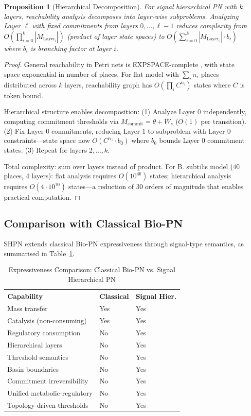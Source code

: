 \documentclass[10pt,letterpaper]{article}
\newtheorem{proposition}{Proposition}
\begin{document}
\begin{proposition}[Hierarchical Decomposition]
For signal hierarchical PN with $k$ layers, reachability analysis decomposes into layer-wise subproblems. Analyzing Layer $\ell$ with fixed commitments from layers $0, \ldots, \ell-1$ reduces complexity from $O(\prod_{i=0}^{k} |M_{\text{Layer}_i}|)$ (product of layer state spaces) to $O(\sum_{i=0}^{k} |M_{\text{Layer}_i}| \cdot b_i)$ where $b_i$ is branching factor at layer $i$.
\end{proposition}

\begin{proof}
General reachability in Petri nets is EXPSPACE-complete \cite{esparza1996}, with state space exponential in number of places. For flat model with $\sum_i n_i$ places distributed across $k$ layers, reachability graph has $O(\prod_i C^{n_i})$ states where $C$ is token bound.

Hierarchical structure enables decomposition: (1) Analyze Layer 0 independently, computing commitment thresholds via $M_{\text{commit}} = \theta + W_s$ ($O(1)$ per transition). (2) Fix Layer 0 commitments, reducing Layer 1 to subproblem with Layer 0 constraints---state space now $O(C^{n_1} \cdot b_0)$ where $b_0$ bounds Layer 0 commitment states. (3) Repeat for layers $2, \ldots, k$.

Total complexity: sum over layers instead of product. For B. subtilis model (40 places, 4 layers): flat analysis requires $O(10^{40})$ states; hierarchical analysis requires $O(4 \cdot 10^{10})$ states---a reduction of 30 orders of magnitude that enables practical computation.
\end{proof}

\subsection{Comparison with Classical Bio-PN}

SHPN extends classical Bio-PN expressiveness through signal-type semantics, as summarised in Table~\ref{tab:comparison}.

\begin{table}[h]
\centering
\small
\caption{Expressiveness Comparison: Classical Bio-PN vs. Signal Hierarchical PN}
\label{tab:comparison}
\begin{tabular}{p{5cm}p{2.5cm}p{2.5cm}}
\toprule
\textbf{Capability} & \textbf{Classical} & \textbf{Signal Hier.} \\
\midrule
Mass transfer & Yes & Yes \\
Catalysis (non-consuming) & Yes & Yes \\
Regulatory consumption & No & Yes \\
Hierarchical layers & No & Yes \\
Threshold semantics & No & Yes \\
Basin boundaries & No & Yes \\
Commitment irreversibility & No & Yes \\
Unified metabolic-regulatory & No & Yes \\
Topology-driven thresholds & No & Yes \\
\bottomrule
\end{tabular}
\end{table}
\end{document}
